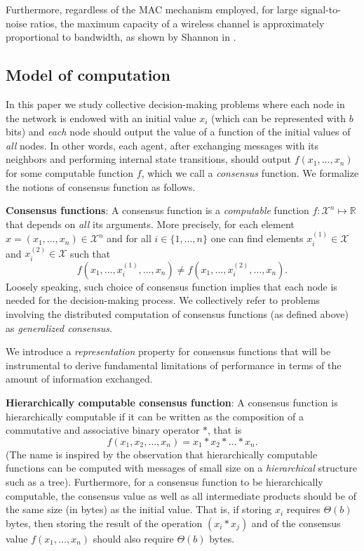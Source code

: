 \documentclass[letterpaper,10pt,conference]{ieeeconf}
\newcommand{\real}{{\mathbb{R}}}
\newcommand{\reals}{\real}
\begin{document}
Furthermore, regardless of the MAC mechanism employed, for large signal-to-noise ratios, the maximum capacity of a wireless channel is approximately proportional to bandwidth, as shown by Shannon in \cite{CES:49}.

\subsection{Model of computation}

In this paper we study collective decision-making problems where each node in the network is endowed with an initial value $x_i$ (which can be represented with $b$ bits) and \emph{each} node should output the value of a function of the initial values of \emph{all} nodes. In other words, each agent, after exchanging messages with its neighbors and performing internal state transitions, should output $f(x_1, \ldots, x_n)$ for some computable function $f$, which we call a \emph{consensus} function.
 We formalize the notions of consensus function as follows.

\textbf{Consensus functions}:
A consensus function is a \emph{computable} function $f : \mathcal X^n \mapsto \reals$ that depends on \emph{all} its arguments. More precisely, for each element $x = (x_1, \ldots, x_n) \in \mathcal X^n$ and for all $i\in\{1, \ldots, n\}$ one can find elements $x_{i}^{(1)}\in \mathcal X$ and $x_{i}^{(2)}\in \mathcal X$ such that
\[
f(x_1, \ldots, x_{i}^{(1)}, \ldots, x_n)\neq f(x_1, \ldots, x_{i}^{(2)}, \ldots, x_n).
\]
Loosely speaking, such choice of consensus function implies that each node is needed for the decision-making process. We collectively refer to problems involving the distributed computation of consensus functions (as defined above) as \emph{generalized consensus}. 

We introduce a \emph{representation} property for consensus functions that will be instrumental to derive fundamental limitations of performance in terms of the amount of information exchanged.

\textbf{Hierarchically computable consensus function}:
A consensus function is hierarchically computable if it can be written as  the composition of  a commutative and associative binary operator $\ast$, that is
\[
f(x_1, x_2,\ldots, x_n) = x_1 \ast x_2\ast \ldots\ast x_n.
\]
(The name is inspired by the observation that hierarchically computable functions can be computed with messages of small size on a \emph{hierarchical} structure such as a  tree). Furthermore, for a consensus function to be hierarchically computable, the consensus value as well as all intermediate products should be of the same size (in bytes) as the initial value. That is, if storing $x_i$ requires $\Theta(b)$ bytes, then storing the result of the operation $(x_i \ast x_j)$ and of the consensus value $f(x_1, \ldots, x_n)$ should also require $\Theta(b)$ bytes.
\end{document}
